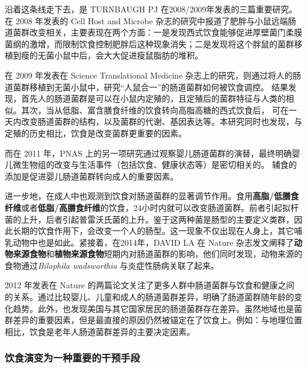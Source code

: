 \documentclass[]{ctexbook}
\begin{document}
沿着这条线走下去，是 TURNBAUGH PJ 在2008/2009年发表的三篇重要研究。在 2008 年发表的 Cell Host and Microbe 杂志的研究中报道了肥胖与小鼠远端肠道菌群改变相关\citep{turnbaughDietInducedObesityLinked2008}，主要表现在两个方面：一是发现西式饮食能够促进厚壁菌门柔膜菌纲的激增，而限制饮食控制肥胖后这种现象消失；二是发现将这个胖鼠的菌群移植到瘦的无菌小鼠中后，会大大促进瘦鼠脂肪的堆积。

在 2009 年发表在 Science Translational Medicine 杂志上的研究，则通过将人的肠道菌群移植到无菌小鼠中，研究``人鼠合一''的肠道菌群如何被饮食调控\citep{turnbaughEffectDietHuman2009}。
结果发现，首先人的肠道菌群是可以在小鼠内定殖的，且定殖后的菌群特征与人类的相似。其次，当从低脂、富含膳食纤维的饮食转向高脂高糖的西式饮食后，
可在一天内改变肠道菌群的结构，以及菌群的代谢、基因表达等。本研究同时也发现，与定殖的历史相比，饮食是改变菌群更重要的因素。

而在 2011 年，PNAS 上的另一项研究通过观察婴儿肠道菌群的演替，最终明确婴儿微生物组的改变与生活事件（包括饮食、健康状态等）是密切相关的\citep{koenigSuccessionMicrobialConsortia2011}。
辅食的添加是促进婴儿肠道菌群转向成人的重要因素。

进一步地，在成人中也观测到饮食对肠道菌群的显著调节作用\citep{wuLinkingLongtermDietary2011}。食用\textbf{高脂/低膳食纤维}或者\textbf{低脂/高膳食纤维}的饮食，24小时内就可以改变肠道菌群。前者引起拟杆菌的上升，后者引起普雷沃氏菌的上升。鉴于这两种菌是肠型的主要定义类群，因此长期的饮食作用下，会改变一个人的肠型。这一现象不仅出现在人身上，其它哺乳动物中也是如此\citep{mueggeDietDrivesConvergence2011}。紧接着，在2014年，DAVID LA 在 Nature 杂志发文阐释了\textbf{动物来源食物}和\textbf{植物来源食物}短期内对肠道菌群的影响\citep{davidDietRapidlyReproducibly2014}，他们同时发现，动物来源的食物通过\emph{Bilophila wadsworthia} 与炎症性肠病关联了起来。

2012 年发表在 Nature 的两篇论文关注了更多人群中肠道菌群与饮食和健康之间的关系\citep[\citet{yatsunenkoHumanGutMicrobiome2012}]{claessonGutMicrobiotaComposition2012}。通过比较婴儿、儿童和成人的肠道菌群差异，明确了肠道菌群随年龄的变化趋势\citep{yatsunenkoHumanGutMicrobiome2012}。此外，也发现美国与其它国家居民的肠道菌群存在差异\citep{yatsunenkoHumanGutMicrobiome2012}。虽然地域也是菌群差异的重要因素，但是最直接的原因仍然被锚定在了饮食上。例如：与地理位置相比，饮食是老年人肠道菌群差异的主要决定因素\citep{claessonGutMicrobiotaComposition2012}。

\hypertarget{ux996eux98dfux6f14ux53d8ux4e3aux4e00ux79cdux91cdux8981ux7684ux5e72ux9884ux624bux6bb5}{%
\subsubsection{饮食演变为一种重要的干预手段}\label{ux996eux98dfux6f14ux53d8ux4e3aux4e00ux79cdux91cdux8981ux7684ux5e72ux9884ux624bux6bb5}}
\end{document}
